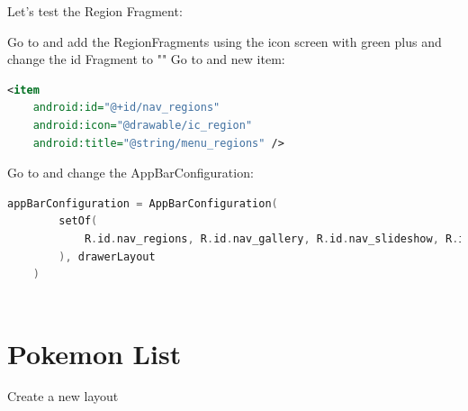 \documentclass[a4paper, 12pt]{article}
\begin{document}
Let's test the Region Fragment:

Go to \textit{\texttt{}} and add the RegionFragments using the icon screen with green plus and change the id Fragment to "\textit{\texttt{}}"
Go to \textit{\texttt{}} and new item:

\begin{lstlisting}[caption={Add new Menu item.}, label={xml:menu_new_item}, language=XML]
    <item
    android:id="@+id/nav_regions"
    android:icon="@drawable/ic_region"
    android:title="@string/menu_regions" />
\end{lstlisting}

Go to \textit{\texttt{}} and change the AppBarConfiguration:

\begin{lstlisting}[caption={Add new Menu item.}, label={xml:menu_new_item}, language=Kotlin]
    appBarConfiguration = AppBarConfiguration(
        setOf(
            R.id.nav_regions, R.id.nav_gallery, R.id.nav_slideshow, R.id.nav_home
        ), drawerLayout
    )
    
\end{lstlisting}

\section{Pokemon List}

Create a new layout \textit{\texttt{}}
\end{document}
